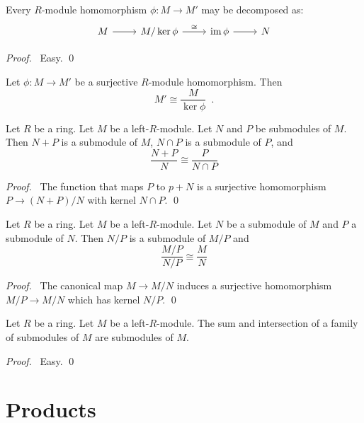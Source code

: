 \begin{thm}
Every $R$-module homomorphism $\phi : M \rightarrow M'$ may be decomposed as:
\[ \begin{tikzcd}
M \arrow[r] & M / \ker \phi \arrow[r,"\cong"] & \im \phi \arrow[r] & N 
\end{tikzcd} \]
\end{thm}

\begin{proof}
\pf\ Easy. \qed
\end{proof}

\begin{cor}
Let $\phi : M \rightarrow M'$ be a surjective $R$-module homomorphism. Then
\[ M' \cong \frac{M}{\ker \phi} \enspace . \]
\end{cor}

\begin{prop}
Let $R$ be a ring. Let $M$ be a left-$R$-module. Let $N$ and $P$ be submodules of $M$. Then $N+P$ is a submodule of $M$, $N \cap P$ is a submodule of $P$, and
\[ \frac{N+P}{N} \cong \frac{P}{N \cap P} \]
\end{prop}

\begin{proof}
\pf\ The function that maps $P$ to $p + N$ is a surjective homomorphism $P \rightarrow (N+P)/N$ with kernel $N \cap P$. \qed
\end{proof}

\begin{prop}
Let $R$ be a ring. Let $M$ be a left-$R$-module. Let $N$ be a submodule of $M$ and $P$ a submodule of $N$. Then $N/P$ is a submodule of $M/P$ and
\[ \frac{M/P}{N/P} \cong \frac{M}{N} \]
\end{prop}

\begin{proof}
\pf\ The canonical map $M \rightarrow M/N$ induces a surjective homomorphism $M/P \rightarrow M/N$ which has kernel $N/P$. \qed
\end{proof}

\begin{prop}
Let $R$ be a ring. Let $M$ be a left-$R$-module.
The sum and intersection of a family of submodules of $M$ are submodules of $M$.
\end{prop}

\begin{proof}
\pf\ Easy. \qed
\end{proof}

\section{Products}

